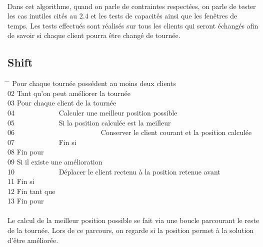 \documentclass[12pt]{article}
\begin{document}
\paragraph{}
Dans cet algorithme, quand on parle de contraintes respectées, on parle de tester les cas inutiles cités au 2.4 et les tests de capacités ainsi que les fenêtres
de temps. Les tests effectués sont réalisés sur tous les clients qui seront échangés afin de savoir si chaque client pourra être changé de tournée.

\subsection{Shift}

\begin{tabbing}
\hspace{1cm} \= \hspace{1cm} \=   Pour chaque tournée possédent au moins deux clients\\
02  \> Tant qu'on peut améliorer la tournée\\
03  \> \> Pour chaque client de la tournée \\
04  \> \> \ \ \ \ \ \ \ \ \ \ \ \ Calculer une meilleur position possible \\
05  \> \> \ \ \ \ \ \ \ \ \ \ \ \ Si la position calculée est la meilleur\\
06  \> \> \ \ \ \ \ \ \ \ \ \ \ \ \ \ \ \ \ \ \ \ \ \ \ \ Conserver le client courant et la position calculée\\
07  \> \> \ \ \ \ \ \ \ \ \ \ \ \ Fin si \\
08  \> \> Fin pour \\
09  \> \> Si il existe une amélioration \\
10  \> \> \ \ \ \ \ \ \ \ \ \ \ \ Déplacer le client rectenu à la position retenue avant \\
11  \> \> Fin si \\
12  \> Fin tant que \\
13  Fin pour \\
\end{tabbing}

\paragraph{}
Le calcul de la meilleur position possible se fait via une boucle parcourant le reste de la tournée. Lors de ce parcours, on regarde si la position 
permet à la solution d'être améliorée.
\end{document}

